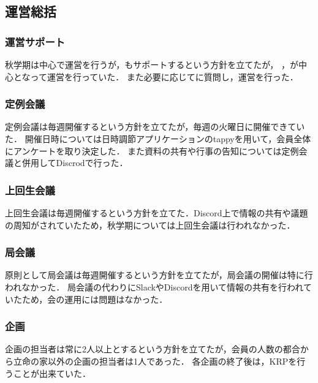 \subsection*{運営総括}


\subsubsection*{運営サポート}
秋学期は\secondGrade{}中心で運営を行うが，\thirdGrade{}もサポートするという方針を立てたが，
\secondGrade{}，\thirdGrade{}が中心となって運営を行っていた．
また必要に応じて\fourthGrade{}に質問し，運営を行った．

\subsubsection*{定例会議}
定例会議は毎週開催するという方針を立てたが，毎週の火曜日に開催できていた．
開催日時については日時調節アプリケーションのtappyを用いて，会員全体にアンケートを取り決定した．
また資料の共有や行事の告知については定例会議と併用してDiscrodで行った．

\subsubsection*{上回生会議}
上回生会議は毎週開催するという方針を立てた．Discord上で情報の共有や議題の周知がされていたため，秋学期については上回生会議は行われなかった．

\subsubsection*{局会議}
原則として局会議は毎週開催するという方針を立てたが，局会議の開催は特に行われなかった．
局会議の代わりにSlackやDiscordを用いて情報の共有を行われていたため，会の運用には問題はなかった．

\subsubsection*{企画}
企画の担当者は常に2人以上とするという方針を立てたが，会員の人数の都合から立命の家以外の企画の担当者は1人であった．
各企画の終了後は，KRPを行うことが出来ていた．
